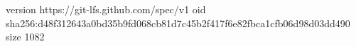 version https://git-lfs.github.com/spec/v1
oid sha256:d48f312643a0bd35b9fd068cb81d7c45b2f417f6e82fbca1cfb06d98d03dd490
size 1082
